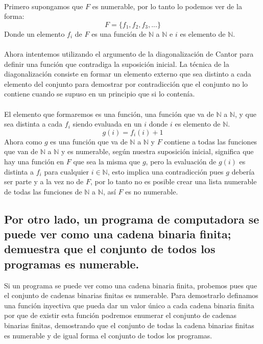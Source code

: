 \documentclass[12pt]{article}
\begin{document}
\paragraph{}
Primero supongamos que $F$ es numerable, por lo tanto lo podemos ver de la forma:
\begin{equation}\label{F_set}
F=\{f_{1}, f_{2}, f_{3}, ...\}
\end{equation}
Donde un elemento $f_{i}$ de $F$ es una función de $\mathbb{N}$ a $\mathbb{N}$ e $i$ es elemento de $\mathbb{N}$.
\paragraph{}
Ahora intentemos utilizando el argumento de la diagonalización de Cantor para definir una función que contradiga la suposición inicial.
La técnica de la diagonalización consiste en formar un elemento externo que sea distinto a cada elemento del conjunto para demostrar por contradicción que el conjunto no lo contiene cuando se supuso en un principio que si lo contenía. 
\paragraph{}
El elemento que formaremos es una función, una función que va  de $\mathbb{N}$ a $\mathbb{N}$, y que sea distinta a cada  $f_{i}$ siendo evaluada en un $i$ donde $i$ es elemento de $\mathbb{N}$.
\begin{equation}\label{g_function}
g(i)=f_{i}(i) + 1
\end{equation}
Ahora como $g$ es una función que va  de $\mathbb{N}$ a $\mathbb{N}$ y $F$ contiene a todas las funciones que van  de $\mathbb{N}$ a $\mathbb{N}$ y es numerable, según nuestra suposición inicial, significa que hay una función en $F$ que sea la misma que $g$, pero la evaluación de $g(i)$ es distinta a $f_{i}$ para cualquier $i \in \mathbb{N}$, esto implica una contradicción pues $g$ debería ser parte y a la vez no de $F$, por lo tanto no es posible crear una lista numerable de todas las funciones de $\mathbb{N}$ a $\mathbb{N}$, así $F$ es no numerable.
\subsection{Por otro lado, un programa de computadora se puede ver como una cadena binaria finita; demuestra que el conjunto de todos los programas es numerable.}\label{ej_cdbin}
Si un programa se puede ver como una cadena binaria finita, probemos pues que el conjunto de cadenas binarias finitas es numerable. Para demostrarlo definamos una función inyectiva que pueda dar un valor único a cada cadena binaria finita por que de existir esta función podremos enumerar el conjunto de cadenas binarias finitas,  demostrando que el conjunto de todas la cadena binarias finitas es numerable y de igual forma el conjunto de todos los programas.
\end{document}

